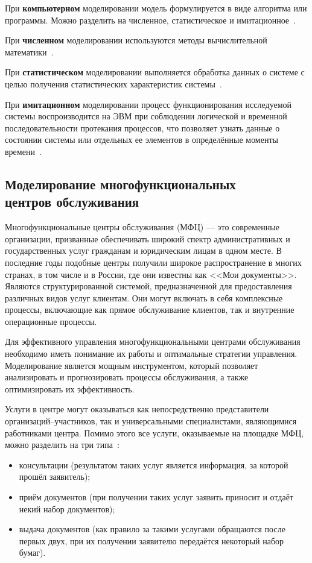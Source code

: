 При \textbf{компьютерном} моделировании модель формулируется в виде алгоритма или программы. Можно разделить на численное, статистическое и имитационное~\cite{m_types}.

При \textbf{численном} моделировании используются методы вычислительной математики~\cite{m_types}.

При \textbf{статистическом} моделировании выполняется обработка данных о системе с целью получения статистических характеристик системы~\cite{m_types}.

При \textbf{имитационном} моделировании процесс функционирования исследуемой системы воспроизводится на ЭВМ при соблюдении логической и временной последовательности протекания процессов, что позволяет узнать данные о состоянии системы или отдельных ее элементов в определённые моменты времени~\cite{m_types}.

\subsection[Моделирование многофункциональных центров обслуживания]{Моделирование многофункциональных\\ центров обслуживания}

Многофункциональные центры обслуживания (МФЦ) --- это современные организации, призванные обеспечивать широкий спектр административных и государственных услуг гражданам и юридическим лицам в одном месте. В последние годы подобные центры получили широкое распространение в многих странах, в том числе и в России, где они известны как <<Мои документы>>. Являются структурированной системой, предназначенной для предоставления различных видов услуг клиентам. Они могут включать в себя комплексные процессы, включающие как прямое обслуживание клиентов, так и внутренние операционные процессы.

Для эффективного управления многофункциональными центрами обслуживания необходимо иметь понимание их работы и оптимальные стратегии управления. Моделирование является мощным инструментом, который позволяет анализировать и прогнозировать процессы обслуживания, а также оптимизировать их эффективность.

Услуги в центре могут оказываться как непосредственно представители организаций--участников, так и универсальными специалистами, являющимися работниками центра. Помимо этого все услуги, оказываемые на площадке МФЦ, можно разделить на три типа~\cite{serv_types}:
\begin{itemize}[label=---]
	\item консультации (результатом таких услуг является информация, за которой прошёл заявитель);
	\item приём документов (при получении таких услуг заявить приносит и отдаёт некий набор документов);
	\item выдача документов (как правило за такими услугами обращаются после первых двух, при их получении заявителю передаётся некоторый набор бумаг).
\end{itemize}


